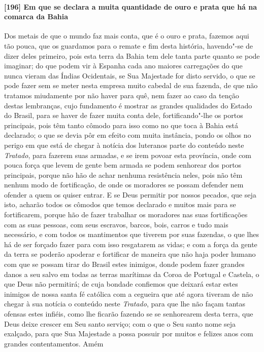 \begin{linenumbers}
\paragraph{[196] Em que se declara a muita quantidade de ouro e prata que há na comarca da
Bahia}\quad
Dos metais de que o mundo faz mais conta, que é o ouro e prata, fazemos aqui tão pouca,
que os guardamos para o remate e fim desta história, havendo"-se de dizer deles primeiro,
pois esta terra da Bahia tem dele tanta parte quanto se pode imaginar; do que podem vir à
Espanha cada ano maiores carregações do que nunca vieram das Índias Ocidentais, se Sua
Majestade for disto servido, o que se pode fazer sem se meter nesta empresa muito cabedal
de sua fazenda, de que não tratamos miudamente por não haver para quê, nem fazer ao caso
da tenção destas lembranças, cujo fundamento é mostrar as grandes qualidades do Estado do
Brasil, para se haver de fazer muita conta dele, fortificando"-lhe os portos principais,
pois têm tanto cômodo para isso como no que toca à Bahia está declarado; o que se devia
pôr em efeito com muita instância, pondo os olhos no perigo em que está de chegar à
notícia dos luteranos parte do conteúdo neste \textit{Tratado}, para fazerem suas armadas,
e se irem povoar esta província, onde com pouca força que levem de gente bem armada se
podem senhorear dos portos principais, porque não hão de achar nenhuma resistência neles,
pois não têm nenhum modo de fortificação, de onde os moradores se possam defender nem
ofender a quem os quiser entrar. E se Deus permitir por nossos pecados, que seja isto,
acharão todos os cômodos que temos declarado e muitos mais para se fortificarem, porque
hão de fazer trabalhar os moradores nas suas fortificações com as suas pessoas, com seus
escravos, barcos, bois, carros e tudo mais necessário, e com todos os mantimentos que
tiverem por suas fazendas, o que lhes há de ser forçado fazer para com isso resgatarem as
vidas; e com a força da gente da terra se poderão apoderar e fortificar de maneira que não
haja poder humano com que se possam tirar do Brasil estes inimigos, donde podem fazer
grandes danos a seu salvo em todas as terras marítimas da Coroa de Portugal e Castela, o
que Deus não permitirá; de cuja bondade confiemos que deixará estar estes inimigos de
nossa santa fé católica com a cegueira que até agora tiveram de não chegar à sua notícia o
conteúdo neste \textit{Tratado}, para que lhe não façam tantas ofensas estes infiéis, como
lhe ficarão fazendo se se senhorearem desta terra, que Deus deixe crescer em Seu santo
serviço; com o que o Seu santo nome seja exalçado, para que Sua Majestade a possa possuir
por muitos e felizes anos com grandes contentamentos. Amém

\end{linenumbers}
